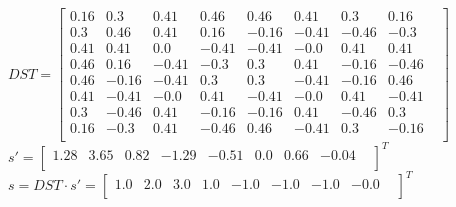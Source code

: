 	$
	DST =
	\begin{bmatrix}
	0.16 & 0.3 & 0.41 & 0.46 & 0.46 & 0.41 & 0.3 & 0.16 & \\
	0.3 & 0.46 & 0.41 & 0.16 & -0.16 & -0.41 & -0.46 & -0.3 & \\
	0.41 & 0.41 & 0.0 & -0.41 & -0.41 & -0.0 & 0.41 & 0.41 & \\
	0.46 & 0.16 & -0.41 & -0.3 & 0.3 & 0.41 & -0.16 & -0.46 & \\
	0.46 & -0.16 & -0.41 & 0.3 & 0.3 & -0.41 & -0.16 & 0.46 & \\
	0.41 & -0.41 & -0.0 & 0.41 & -0.41 & -0.0 & 0.41 & -0.41 & \\
	0.3 & -0.46 & 0.41 & -0.16 & -0.16 & 0.41 & -0.46 & 0.3 & \\
	0.16 & -0.3 & 0.41 & -0.46 & 0.46 & -0.41 & 0.3 & -0.16 & \\
	\end{bmatrix}
	$ \\ $
	s' =
	\begin{bmatrix}
	1.28 & 3.65 & 0.82 & -1.29 & -0.51 & 0.0 & 0.66 & -0.04 & \\
	\end{bmatrix}
	^T $ \\ $
	s = DST \cdot s' =
	\begin{bmatrix}
	1.0 & 2.0 & 3.0 & 1.0 & -1.0 & -1.0 & -1.0 & -0.0 & \\
	\end{bmatrix}
	^T $
	
\newpage